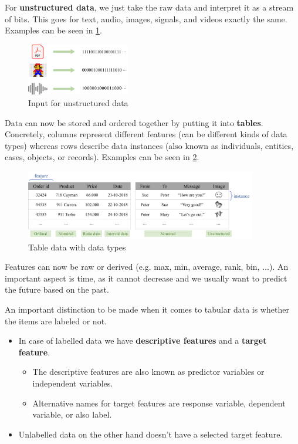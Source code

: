 For \textbf{unstructured data}, we just take the raw data and interpret it as a stream of bits. This goes for text, audio, images, signals, and videos exactly the same. Examples can be seen in \ref{fig:1_unstructured_data}.

\begin{figure}[H]
  \centering
  \includegraphics[width=0.4\textwidth]{assets/basics/unstructured_data.png}
  \caption{Input for unstructured data}
  \label{fig:1_unstructured_data}
\end{figure}

Data can now be stored and ordered together by putting it into \textbf{tables}. Concretely, columns represent different features (can be different kinds of data types) whereas rows describe data instances (also known as individuals, entities, cases, objects, or records). Examples can be seen in \ref{fig:1_table_data}.

\begin{figure}[H]
  \centering
  \includegraphics[width=0.9\textwidth]{assets/basics/table_data.png}
  \caption{Table data with data types}
  \label{fig:1_table_data}
\end{figure}

Features  can now be raw or derived (e.g. max, min, average, rank, bin, $\dots$). An important aspect is time, as it cannot decrease and we usually want to predict the future based on the past. 

An important distinction to be made when it comes to tabular data is whether the items are labeled or not.
\begin{itemize}
  \item {}In case of labelled data we have \textbf{descriptive features} and a \textbf{target feature}.
  \begin{itemize}
    \item The descriptive features are also known as predictor variables or independent variables.
    \item Alternative names for target features are response variable, dependent variable, or also label.
  \end{itemize}
  \item {}Unlabelled data on the other hand doesn't have a selected target feature.
\end{itemize}

